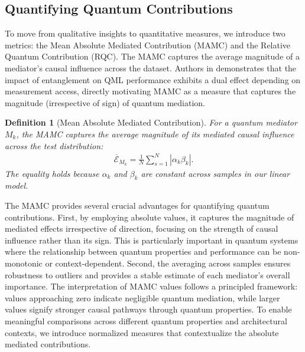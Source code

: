 \documentclass[
    reprint,
    amsmath, amssymb,
    aps,
    floatfix,
    nofootinbib
]{revtex4-1}
\newtheorem{definition}{Definition}
\begin{document}
\subsection{Quantifying Quantum Contributions}
To move from qualitative insights to quantitative measures, we introduce two metrics: the Mean Absolute Mediated Contribution (MAMC) and the Relative Quantum Contribution (RQC). The MAMC captures the average magnitude of a mediator’s causal influence across the dataset. Authors in \cite{wang2024transition}  demonstrates that the impact of entanglement on QML performance exhibits a dual effect depending on measurement access, directly motivating MAMC as a measure that captures the magnitude (irrespective of sign) of quantum mediation.
\begin{definition}[Mean Absolute Mediated Contribution]
For a quantum mediator $M_k$, the MAMC captures the average magnitude of its mediated causal influence across the test distribution:
\begin{align}
    \overline{\mathcal{E}}_{M_k} = \frac{1}{N} \sum_{s=1}^{N} |\alpha_k \beta_k|. \label{eq:MAMC}
\end{align}
The equality holds because $\alpha_k$ and $\beta_k$ are constant across samples in our linear model.
\end{definition}

The MAMC provides several crucial advantages for quantifying quantum contributions. First, by employing absolute values, it captures the magnitude of mediated effects irrespective of direction, focusing on the strength of causal influence rather than its sign. This is particularly important in quantum systems where the relationship between quantum properties and performance can be non-monotonic or context-dependent. 
Second, the averaging across samples ensures robustness to outliers and provides a stable estimate of each mediator's overall importance. The interpretation of MAMC values follows a principled framework: values approaching zero indicate negligible quantum mediation, while larger values signify stronger causal pathways through quantum properties.  To enable meaningful comparisons across different quantum properties and architectural contexts, we introduce normalized measures that contextualize the absolute mediated contributions.
\end{document}
